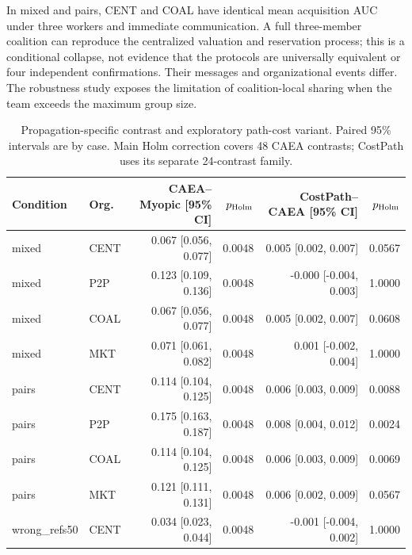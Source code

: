 In mixed and pairs, CENT and COAL have identical mean acquisition AUC under three workers and immediate communication. A full three-member coalition can reproduce the centralized valuation and reservation process; this is a conditional collapse, not evidence that the protocols are universally equivalent or four independent confirmations. Their messages and organizational events differ. The robustness study exposes the limitation of coalition-local sharing when the team exceeds the maximum group size.

\begin{table}[t]\centering\small

\caption{Propagation-specific contrast and exploratory path-cost variant. Paired 95\% intervals are by case. Main Holm correction covers 48 CAEA contrasts; CostPath uses its separate 24-contrast family.}

\begin{tabular}{llrrrr}\toprule Condition & Org. & CAEA--Myopic [95\% CI] & $p_{\rm Holm}$ & CostPath--CAEA [95\% CI] & $p_{\rm Holm}$\\\midrule

mixed & CENT & 0.067 [0.056, 0.077] & 0.0048 & 0.005 [0.002, 0.007] & 0.0567\\

mixed & P2P & 0.123 [0.109, 0.136] & 0.0048 & -0.000 [-0.004, 0.003] & 1.0000\\

mixed & COAL & 0.067 [0.056, 0.077] & 0.0048 & 0.005 [0.002, 0.007] & 0.0608\\

mixed & MKT & 0.071 [0.061, 0.082] & 0.0048 & 0.001 [-0.002, 0.004] & 1.0000\\

pairs & CENT & 0.114 [0.104, 0.125] & 0.0048 & 0.006 [0.003, 0.009] & 0.0088\\

pairs & P2P & 0.175 [0.163, 0.187] & 0.0048 & 0.008 [0.004, 0.012] & 0.0024\\

pairs & COAL & 0.114 [0.104, 0.125] & 0.0048 & 0.006 [0.003, 0.009] & 0.0069\\

pairs & MKT & 0.121 [0.111, 0.131] & 0.0048 & 0.006 [0.002, 0.009] & 0.0567\\

wrong\_refs50 & CENT & 0.034 [0.023, 0.044] & 0.0048 & -0.001 [-0.004, 0.002] & 1.0000\\


\end{tabular}
\end{table}
